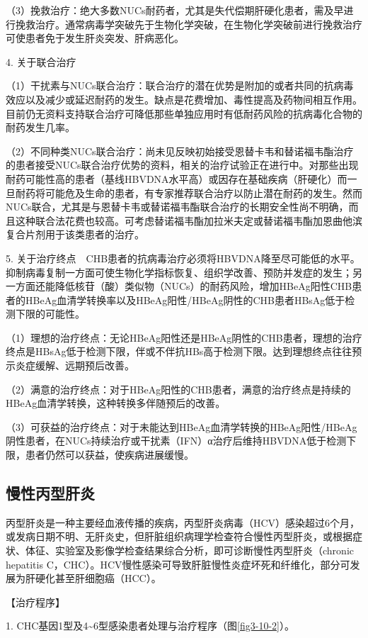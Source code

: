 （3）挽救治疗：绝大多数NUCs耐药者，尤其是失代偿期肝硬化患者，需及早进行挽救治疗。通常病毒学突破先于生物化学突破，在生物化学突破前进行挽救治疗可使患者免于发生肝炎突发、肝病恶化。

4. 关于联合治疗

（1）干扰素与NUCs联合治疗：联合治疗的潜在优势是附加的或者共同的抗病毒效应以及减少或延迟耐药的发生。缺点是花费增加、毒性提高及药物间相互作用。目前仍无资料支持联合治疗可降低那些单独应用时有低耐药风险的抗病毒化合物的耐药发生几率。

（2）不同种类NUCs联合治疗：尚未见反映初始接受恩替卡韦和替诺福韦酯治疗的患者接受NUCs联合治疗优势的资料，相关的治疗试验正在进行中。对那些出现耐药可能性高的患者（基线HBVDNA水平高）或因存在基础疾病（肝硬化）而一旦耐药将可能危及生命的患者，有专家推荐联合治疗以防止潜在耐药的发生。然而NUCs联合，尤其是与恩替卡韦或替诺福韦酯联合治疗的长期安全性尚不明确，而且这种联合法花费也较高。可考虑替诺福韦酯加拉米夫定或替诺福韦酯加恩曲他滨复合片剂用于该类患者的治疗。

5.
关于治疗终点　CHB患者的抗病毒治疗必须将HBVDNA降至尽可能低的水平。抑制病毒复制一方面可使生物化学指标恢复、组织学改善、预防并发症的发生；另一方面还能降低核苷（酸）类似物（NUCs）的耐药风险，增加HBeAg阳性CHB患者的HBeAg血清学转换率以及HBeAg阳性/HBeAg阴性的CHB患者HBsAg低于检测下限的可能性。

（1）理想的治疗终点：无论HBeAg阳性还是HBeAg阴性的CHB患者，理想的治疗终点是HBsAg低于检测下限，伴或不伴抗HBs高于检测下限。达到理想终点往往预示炎症缓解、远期预后改善。

（2）满意的治疗终点：对于HBeAg阳性的CHB患者，满意的治疗终点是持续的HBeAg血清学转换，这种转换多伴随预后的改善。

（3）可获益的治疗终点：对于未能达到HBeAg血清学转换的HBeAg阳性/HBeAg阴性患者，在NUCs持续治疗或干扰素（IFN）α治疗后维持HBVDNA低于检测下限，患者仍然可以获益，使疾病进展缓慢。

\subsection{慢性丙型肝炎}

丙型肝炎是一种主要经血液传播的疾病，丙型肝炎病毒（HCV）感染超过6个月，或发病日期不明、无肝炎史，但肝脏组织病理学检查符合慢性丙型肝炎，或根据症状、体征、实验室及影像学检查结果综合分析，即可诊断慢性丙型肝炎（chronic
hepatitis
C，CHC）。HCV慢性感染可导致肝脏慢性炎症坏死和纤维化，部分可发展为肝硬化甚至肝细胞癌（HCC）。

【治疗程序】

1. CHC基因1型及4\textasciitilde{}6型感染患者处理与治疗程序（图\ref{fig3-10-2}）。

